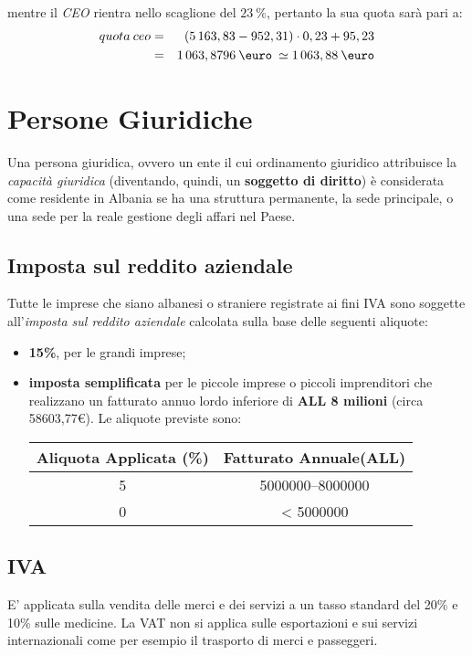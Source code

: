 mentre il \textit{CEO} rientra nello scaglione del $23 \:\%$, pertanto la sua quota sarà pari a:
\begin{eqnarray}
\label{eq:imposta_redditi_ceo}
quota \: ceo & = & (5\thinspace 163,83-952,31) \cdot 0,23 + 95,23 \nonumber \\
					 & = & 1\thinspace 063,8796 \: \mbox{\euro} \: \simeq 1\thinspace 063,88 \: \mbox{\euro}
\end{eqnarray} 


\section[Persone Giuridiche]{Persone Giuridiche}
Una persona giuridica, ovvero un ente il cui ordinamento giuridico attribuisce la \textit{capacità giuridica} (diventando, quindi, un \textbf{soggetto di diritto}) è considerata come residente in Albania se ha una struttura permanente, la sede principale, o una sede per la reale gestione degli affari nel Paese.
\subsection{Imposta sul reddito aziendale} 
Tutte le imprese che siano albanesi o straniere registrate ai fini \ac{IVA} sono soggette all'\textit{imposta sul reddito aziendale} calcolata sulla base delle seguenti aliquote:
\begin{itemize}
	\item \textbf{15\%}, per le grandi imprese;
	\item \textbf{imposta semplificata} per le piccole imprese o piccoli imprenditori che realizzano un fatturato annuo lordo inferiore di \textbf{ALL 8 milioni} (circa 58603,77\euro). Le aliquote previste sono:
		\begin{center}
 			\begin{tabular}{SS[table-comparator = true]}
 			\toprule 
 				{Aliquota Applicata (\%)} & {Fatturato Annuale(ALL)} \\
 			 & \numrange{5000000}{8000000} \\
 				0 & < 5000000 \\
 			\bottomrule
 			\end{tabular} 
		\end{center}
\end{itemize} 
\subsection{IVA}
E' applicata sulla vendita delle merci e dei servizi a un tasso standard del 20\% e 10\% sulle medicine. La VAT non si applica sulle
esportazioni e sui servizi internazionali come per esempio il trasporto di merci e passeggeri.
